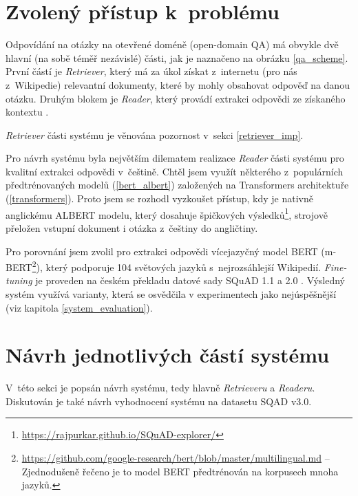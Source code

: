 \section{Zvolený přístup k~problému}
Odpovídání na otázky na otevřené doméně (open-domain QA) má obvykle dvě hlavní (na sobě téměř nezávislé) části, jak je naznačeno na obrázku \ref{qa_scheme}. První částí je \emph{Retriever}, který má za úkol získat z~internetu (pro nás z~Wikipedie) relevantní dokumenty, které by mohly obsahovat odpověď na danou otázku. Druhým blokem je \emph{Reader}, který provádí extrakci odpovědi ze získaného kontextu \cite{drQA}.\par
\noindent\emph{Retriever} části systému je věnována pozornost v~sekci \ref{retriever_imp}.\par
Pro návrh systému byla největším dilematem realizace \emph{Reader} části systému pro kvalitní extrakci odpovědi v~češtině. Chtěl jsem využít některého z~populárních předtrénovaných modelů (\ref{bert_albert}) založených na Transformers \cite{Transformers} architektuře (\ref{transformers}). Proto jsem se rozhodl vyzkoušet přístup, kdy je nativně anglickému ALBERT modelu, který dosahuje špičkových výsledků\footnote{\url{https://rajpurkar.github.io/SQuAD-explorer/}}, strojově přeložen vstupní dokument i otázka z~češtiny do angličtiny.\par
Pro porovnání jsem zvolil pro extrakci odpovědi vícejazyčný model BERT (m-BERT\footnote{\url{https://github.com/google-research/bert/blob/master/multilingual.md} -- Zjednodušeně řečeno je to model BERT předtrénován na korpusech mnoha jazyků.}), který podporuje 104 světových jazyků s~nejrozsáhlejší Wikipedií. \emph{Fine-tuning} je proveden na českém překladu datové sady SQuAD 1.1 a 2.0 \cite{czech_squad} \cite{squad}. Výsledný systém využívá varianty, která se osvědčila v experimentech jako nejúspěšnější (viz kapitola \ref{system_evaluation}).\par

\section{Návrh jednotlivých částí systému}
\label{design}
V~této sekci je popsán návrh systému, tedy hlavně \emph{Retrieveru} a \emph{Readeru}. Diskutován je také návrh vyhodnocení systému na datasetu SQAD v3.0.


